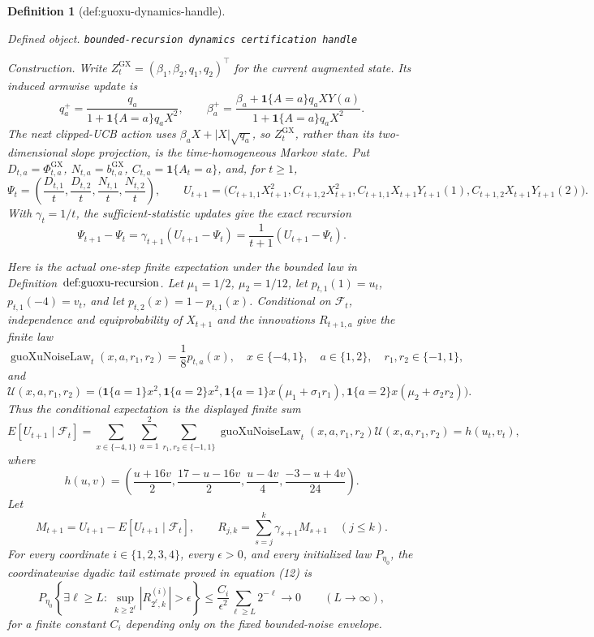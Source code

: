 \documentclass{article}
\newtheorem{definition}{Definition}
\begin{document}
\begin{definition}[def:guoxu-dynamics-handle]\label{def:guoxu-dynamics-handle}
\par\smallskip\noindent\emph{Defined object.} \texttt{bounded-\allowbreak{}recursion dynamics certification handle}
\par\smallskip\noindent\emph{Construction.} Write \(Z^{\mathrm{GX}}_t=(\beta_1,\beta_2,q_1,q_2)^\top\) for the current augmented state. Its induced armwise update is
\[
q_a^+=\frac{q_a}{1+\mathbf 1\{A=a\}q_aX^2},\qquad
\beta_a^+=\frac{\beta_a+\mathbf 1\{A=a\}q_aXY(a)}{1+\mathbf 1\{A=a\}q_aX^2}.
\]
The next clipped-UCB action uses \(\beta_aX+|X|\sqrt{q_a}\), so \(Z^{\mathrm{GX}}_t\), rather than its two-dimensional slope projection, is the time-homogeneous Markov state. Put \(D_{t,a}=\Phi^{\mathrm{GX}}_{t,a}\), \(N_{t,a}=b^{\mathrm{GX}}_{t,a}\), \(C_{t,a}=\mathbf 1\{A_t=a\}\), and, for \(t\geq1\),
\[
\Psi_t=\left(\frac{D_{t,1}}t,\frac{D_{t,2}}t,\frac{N_{t,1}}t,\frac{N_{t,2}}t\right),\qquad
U_{t+1}=\bigl(C_{t+1,1}X_{t+1}^2,C_{t+1,2}X_{t+1}^2,
C_{t+1,1}X_{t+1}Y_{t+1}(1),C_{t+1,2}X_{t+1}Y_{t+1}(2)\bigr).
\]
With \(\gamma_t=1/t\), the sufficient-statistic updates give the exact recursion
\[
\Psi_{t+1}-\Psi_t=\gamma_{t+1}(U_{t+1}-\Psi_t)=\frac1{t+1}(U_{t+1}-\Psi_t).
\]

Here is the actual one-step finite expectation under the bounded law in Definition~\(\textnormal{def:guoxu-recursion}\). Let \(\mu_1=1/2\), \(\mu_2=1/12\), let \(p_{t,1}(1)=u_t\), \(p_{t,1}(-4)=v_t\), and let \(p_{t,2}(x)=1-p_{t,1}(x)\). Conditional on \(\mathcal F_t\), independence and equiprobability of \(X_{t+1}\) and the innovations \(R_{t+1,a}\) give the finite law
\[
\operatorname{guoXuNoiseLaw}_t(x,a,r_1,r_2)
=\frac18p_{t,a}(x),
\quad x\in\{-4,1\},\quad a\in\{1,2\},\quad r_1,r_2\in\{-1,1\},
\]
and
\[
\mathcal U(x,a,r_1,r_2)=
\bigl(\mathbf1\{a=1\}x^2,\mathbf1\{a=2\}x^2,
\mathbf1\{a=1\}x(\mu_1+\sigma_1r_1),
\mathbf1\{a=2\}x(\mu_2+\sigma_2r_2)\bigr).
\]
Thus the conditional expectation is the displayed finite sum
\[
E[U_{t+1}\mid\mathcal F_t]
=\sum_{x\in\{-4,1\}}\sum_{a=1}^2\sum_{r_1,r_2\in\{-1,1\}}
\operatorname{guoXuNoiseLaw}_t(x,a,r_1,r_2)\mathcal U(x,a,r_1,r_2)
=h(u_t,v_t),
\]
where
\[
h(u,v)=\left(\frac{u+16v}{2},\frac{17-u-16v}{2},
\frac{u-4v}{4},\frac{-3-u+4v}{24}\right).
\]
Let
\[
M_{t+1}=U_{t+1}-E[U_{t+1}\mid\mathcal F_t],
\qquad
R_{j,k}=\sum_{s=j}^k\gamma_{s+1}M_{s+1}\quad(j\leq k).
\]
For every coordinate \(i\in\{1,2,3,4\}\), every \(\epsilon>0\), and every initialized law \(P_{\eta_0}\), the coordinatewise dyadic tail estimate proved in equation (12) is
\[
P_{\eta_0}\!\left\{\exists\ell\geq L:\ 
\sup_{k\geq2^\ell}\left|R_{2^\ell,k}^{(i)}\right|>\epsilon\right\}
\leq \frac{C_i}{\epsilon^2}\sum_{\ell\geq L}2^{-\ell}
\longrightarrow0\qquad(L\to\infty),
\]
for a finite constant \(C_i\) depending only on the fixed bounded-noise envelope.


\end{definition}
\end{document}
